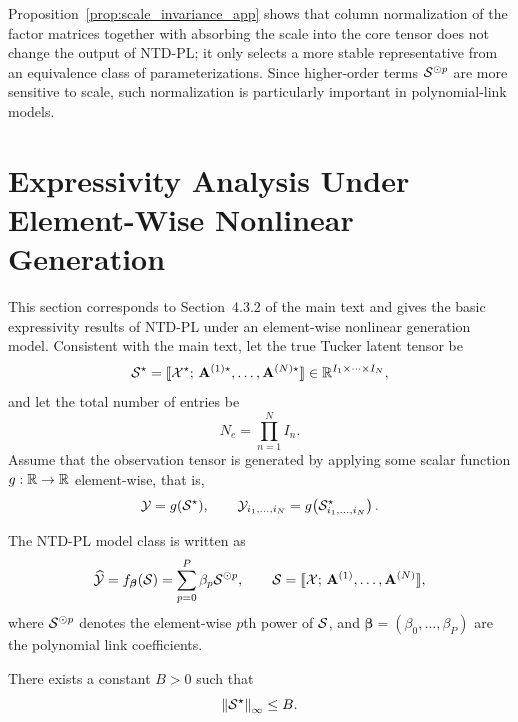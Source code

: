 \begin{remark}
Proposition~\ref{prop:scale_invariance_app} shows that column normalization of the factor matrices together with absorbing the scale into the core tensor does not change the output of NTD-PL; it only selects a more stable representative from an equivalence class of parameterizations. Since higher-order terms $\mathcal{S}^{\odot p}$ are more sensitive to scale, such normalization is particularly important in polynomial-link models.
\end{remark}

\section{Expressivity Analysis Under Element-Wise Nonlinear Generation}
\label{app:expressivity}

This section corresponds to Section~4.3.2 of the main text and gives the basic expressivity results of NTD-PL under an element-wise nonlinear generation model. Consistent with the main text, let the true Tucker latent tensor be
\begin{equation}
\mathcal{S}^\star
=
\llbracket
\mathcal{X}^\star;\,
\mathbf A^{(1)\star},\dots,\mathbf A^{(N)\star}
\rrbracket
\in \mathbb{R}^{I_1\times\cdots\times I_N},
\end{equation}
and let the total number of entries be
\begin{equation}
N_e=\prod_{n=1}^N I_n.
\end{equation}
Assume that the observation tensor is generated by applying some scalar function $g:\mathbb{R}\to\mathbb{R}$ element-wise, that is,
\begin{equation}
\mathcal{Y} = g(\mathcal{S}^\star), \qquad
\mathcal{Y}_{i_1,\dots,i_N}
=
g\!\left(\mathcal{S}^\star_{i_1,\dots,i_N}\right).
\end{equation}

The NTD-PL model class is written as
\begin{equation}
\widehat{\mathcal{Y}}
=
f_{\boldsymbol\beta}(\mathcal{S})
=
\sum_{p=0}^{P}\beta_p \mathcal{S}^{\odot p},
\qquad
\mathcal{S}=
\llbracket
\mathcal{X};\,
\mathbf A^{(1)},\dots,\mathbf A^{(N)}
\rrbracket,
\label{eq:ntdpl_appendix_model}
\end{equation}
where $\mathcal{S}^{\odot p}$ denotes the element-wise $p$th power of $\mathcal{S}$, and $\boldsymbol\beta=(\beta_0,\dots,\beta_P)$ are the polynomial link coefficients.

\begin{assumption}[Boundedness]
\label{ass:bounded_S}
There exists a constant $B>0$ such that
\begin{equation}
\left\lVert \mathcal{S}^\star \right\rVert_{\infty}\le B.
\end{equation}
\end{assumption}

